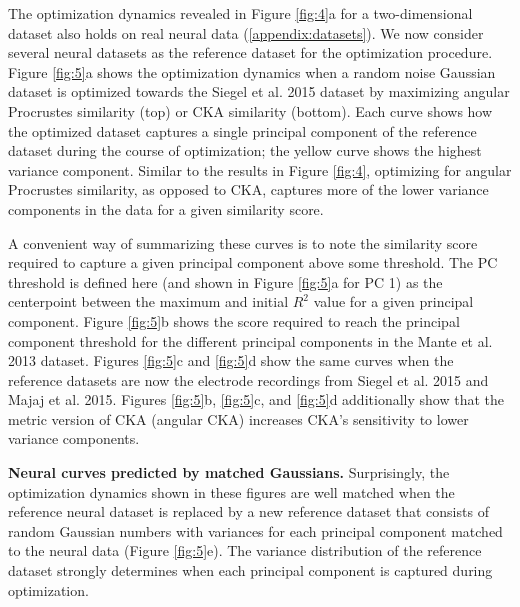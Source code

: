 \documentclass{article} %
\begin{document}
The optimization dynamics revealed in Figure \ref{fig:4}a for a two-dimensional dataset also holds on real neural data (\ref{appendix:datasets}). We now consider several neural datasets as the reference dataset for the optimization procedure. Figure \ref{fig:5}a shows the optimization dynamics when a random noise Gaussian dataset is optimized towards the Siegel et al. 2015 dataset by maximizing angular Procrustes similarity (top) or CKA similarity (bottom). Each curve shows how the optimized dataset captures a single principal component of the reference dataset during the course of optimization; the yellow curve shows the highest variance component. Similar to the results in Figure \ref{fig:4}, optimizing for angular Procrustes similarity, as opposed to CKA, captures more of the lower variance components in the data for a given similarity score. 

A convenient way of summarizing these curves is to note the similarity score required to capture a given principal component above some threshold. The PC threshold is defined here (and shown in Figure \ref{fig:5}a for PC 1) as the centerpoint between the maximum and initial $R^{2}$ value for a given principal component. Figure \ref{fig:5}b shows the score required to reach the principal component threshold for the different principal components in the Mante et al. 2013 dataset. Figures \ref{fig:5}c and \ref{fig:5}d show the same curves when the reference datasets are now the electrode recordings from Siegel et al. 2015 and Majaj et al. 2015. Figures \ref{fig:5}b, \ref{fig:5}c, and \ref{fig:5}d additionally show that the metric version of CKA (angular CKA) increases CKA's sensitivity to lower variance components. 


\textbf{Neural curves predicted by matched Gaussians.} Surprisingly, the optimization dynamics shown in these figures are well matched when the reference neural dataset is replaced by a new reference dataset that consists of random Gaussian numbers with variances for each principal component matched to the neural data (Figure \ref{fig:5}e). The variance distribution of the reference dataset strongly determines when each principal component is captured during optimization.%
\end{document}
